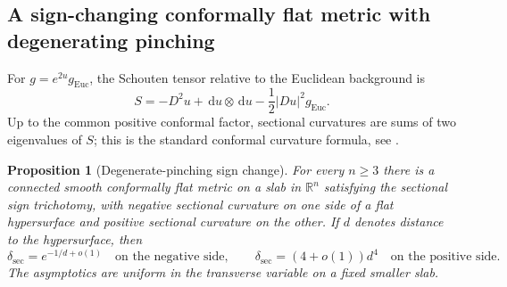 \documentclass[11pt,reqno]{amsart}
\newtheorem{proposition}[theorem]{Proposition}
\theoremstyle{definition}
\theoremstyle{remark}
\newcommand{\dd}{\,\mathrm d}
\newcommand{\R}{\mathbb R}
\newcommand{\dsec}{\delta_{\mathrm{sec}}}
\newcommand{\abs}[1]{\lvert #1\rvert}
\begin{document}
\subsection{A sign-changing conformally flat metric with degenerating pinching}

For $g=e^{2u}g_{\mathrm{Euc}}$, the Schouten tensor relative to the Euclidean background is
\begin{equation}\label{eq:Schouten-conf}
S=-D^2u+\dd u\otimes\dd u-\frac12\abs{Du}^2g_{\mathrm{Euc}}.
\end{equation}
Up to the common positive conformal factor, sectional curvatures are sums of two eigenvalues of $S$; this is the standard conformal curvature formula, see \cite[Chapter 1]{Besse}.

\begin{proposition}[Degenerate-pinching sign change]\label{prop:conformal-signchange}
For every $n\ge3$ there is a connected smooth conformally flat metric on a slab in $\R^n$ satisfying the sectional sign trichotomy, with negative sectional curvature on one side of a flat hypersurface and positive sectional curvature on the other.  If $d$ denotes distance to the hypersurface, then
\begin{equation}\label{eq:degenerate-rates}
\dsec=e^{-1/d+o(1)}
\quad\text{on the negative side},
\qquad
\dsec=(4+o(1))d^4
\quad\text{on the positive side}.
\end{equation}
The asymptotics are uniform in the transverse variable on a fixed smaller slab.
\end{proposition}
\end{document}
